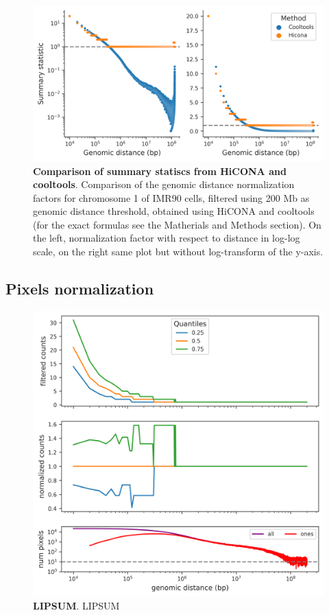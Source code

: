 \begin{figure}[h]
  \centering
  \includegraphics[width=1\textwidth]{hicona_vs_cooltools.png}
  \caption{\textbf{Comparison of summary statiscs from HiCONA and cooltools}. Comparison of the genomic distance normalization factors for chromosome 1 of IMR90 cells, filtered using 200 Mb as genomic distance threshold, obtained using HiCONA and cooltools (for the exact formulas see the Matherials and Methods section). On the left, normalization factor with respect to distance in log-log scale, on the right same plot but without log-transform of the y-axis.}
  \label{fig:cooltools}
\end{figure}


\subsection{Pixels normalization}

\begin{figure}[h]
  \centering
  \includegraphics[width=1\textwidth]{normalization_stats.png}
  \caption{\textbf{LIPSUM}. LIPSUM}
  \label{fig:normstats}
\end{figure}

